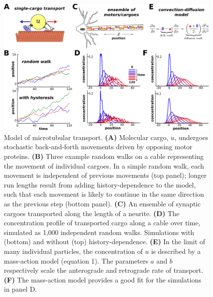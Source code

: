 \documentclass[11pt]{wlpeerj}
\begin{document}
\begin{figure}[!t]
\begin{center}
\includegraphics[width=0.9\columnwidth]{00_stochastic.png}
\caption{Model of microtubular transport.
\textbf{(A)} Molecular cargo, $u$, undergoes stochastic back-and-forth movements driven by opposing motor proteins.
\textbf{(B)} Three example random walks on a cable representing the movement of individual cargoes. In a simple random walk, each movement is independent of previous movements (top panel); longer run lengths result from adding history-dependence to the model, such that each movement is likely to continue in the same direction as the previous step (bottom panel).
\textbf{(C)} An ensemble of synaptic cargoes transported along the length of a neurite.
\textbf{(D)} The concentration profile of transported cargo along a cable over time, simulated as 1,000 independent random walks. Simulations with (bottom) and without (top) history-dependence.
\textbf{(E)} In the limit of many individual particles, the concentration of $u$ is described by a mass-action model (equation 1). The parameters $a$ and $b$ respectively scale the anterograde and retrograde rate of transport.
\textbf{(F)} The mass-action model provides a good fit for the simulations in panel D.
}
\end{center}
\end{figure}
\end{document}
